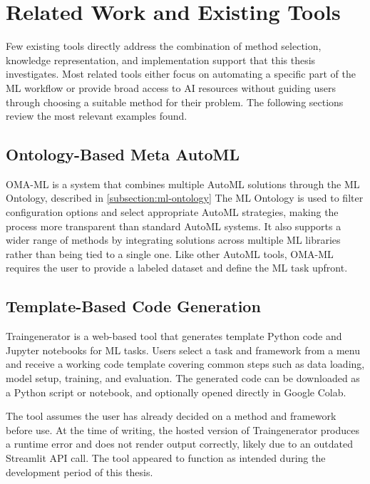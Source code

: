 \section{Related Work and Existing Tools}

Few existing tools directly address the combination of 
method selection, knowledge representation, and 
implementation support that this thesis investigates. 
Most related tools either focus on automating a specific 
part of the ML workflow or provide broad access to AI 
resources without guiding users through choosing a 
suitable method for their problem. The following sections 
review the most relevant examples found.

\subsection{Ontology-Based Meta AutoML}

OMA-ML \parencite{zender2022ontology_based_meta_automl} 
is a system that combines multiple AutoML solutions 
through the ML Ontology, described in \ref{subsection:ml-ontology} 
The ML Ontology is used to filter configuration 
options and select appropriate AutoML strategies, 
making the process more transparent than standard 
AutoML systems. It also supports a wider range of 
methods by integrating solutions across multiple 
ML libraries rather than being tied to a single one.
Like other AutoML tools, OMA-ML requires the user 
to provide a labeled dataset and define the ML task 
upfront. 

\subsection{Template-Based Code Generation}

Traingenerator \parencite{rieke2021traingenerator} 
is a web-based tool that generates template Python 
code and Jupyter notebooks for ML tasks. Users select 
a task and framework from a menu and receive a working 
code template covering common steps such as data 
loading, model setup, training, and evaluation. 
The generated code can be downloaded as a Python 
script or notebook, and optionally opened directly 
in Google Colab.

The tool assumes the user has already decided on a 
method and framework before use. At the time of 
writing, the hosted version of Traingenerator 
produces a runtime error and does not render output 
correctly, likely due to an outdated Streamlit API 
call. The tool appeared to function as intended 
during the development period of this thesis.

